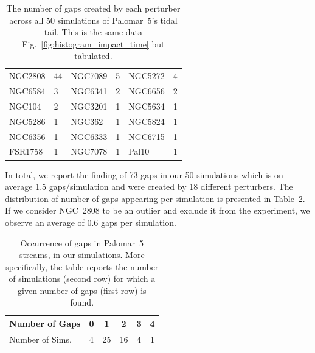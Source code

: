 \documentclass[draft]{aa}
\begin{document}
    \begin{table}[h]
      \centering
      \begin{tabular}{|ll|ll|ll|}
      \hline
      NGC2808 & 44 & NGC7089 & 5 & NGC5272 & 4 \\
      NGC6584 & 3 & NGC6341 & 2 & NGC6656 & 2 \\
      NGC104 & 2 & NGC3201 & 1 & NGC5634 & 1 \\
      NGC5286 & 1 & NGC362 & 1 & NGC5824 & 1 \\
      NGC6356 & 1 & NGC6333 & 1 & NGC6715 & 1 \\
      FSR1758 & 1 & NGC7078 & 1 & Pal10 & 1 \\
      \hline
      \end{tabular}
      \caption{The number of gaps created by each perturber across all 50 simulations of Palomar~5's tidal tail. This is the same data Fig.~\ref{fig:histogram_impact_time} but tabulated.}
      \label{tab:gaps_per_perturber}
    \end{table} 
    
    In total, we report the finding of 73 gaps in our 50 simulations which is on average 1.5 gaps/simulation and were created by 18 different perturbers. The distribution of number of gaps appearing per simulation is presented in Table~\ref{table:gap_distribution}. If we consider NGC~2808 to be an outlier and exclude it from the experiment, we observe an average of 0.6 gaps per simulation.  
    
    \begin{table}[h]
      \centering
        \begin{tabular}{|l|c|c|c|c|c|}
          \hline
          Number of Gaps & 0 & 1 & 2 & 3 & 4 \\
          \hline
          Number of Sims. & 4 & 25 & 16 & 4 & 1 \\
          \hline
        \end{tabular}
        \vspace{0.5cm}
      \caption{Occurrence of gaps in Palomar~5 streams,  in our simulations. More specifically, the table reports the number of simulations (second row) for which a given number of gaps (first row) is found. }\label{table:gap_distribution}
    \end{table}
\end{document}

